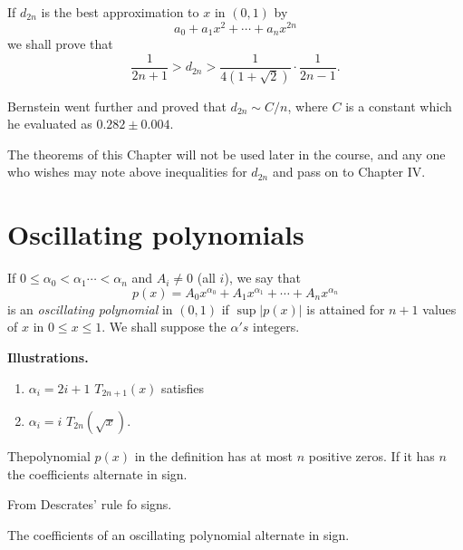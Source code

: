 If $d_{2n}$ is the best approximation to $x$ in $(0,1)$ by 
$$
a_ 0 +a_1 x^2+ \cdots + a_n x^{2n}
$$
we shall prove that
$$
\frac{1}{2n+1} > d_{2n}> \frac{1}{4(1+ \sqrt{2})}\cdot \frac{1}{2n-1}.
$$

Bernstein went further and proved that $d_{2n} \sim C/n$, where $C$ is
a constant which he evaluated as $0.282 \pm 0.004$. 

The theorems of this Chapter will not be used later in the course, and
any one who wishes may note above inequalities for $d_{2n}$ and pass
on to Chapter IV. 

\section{Oscillating polynomials}\label{chap3:sec8}

\begin{defi*}
  If $0 \leq \alpha_ 0 < \alpha_1 \cdots < \alpha_n$ and $A_i \neq 0$
  (all $i$), we say that 
  $$
  p(x)=A_ 0 x^{\alpha _0}+A_1 x^{\alpha_ 1}+ \cdots + A_n x^{\alpha _ n}
  $$
  is an \textit{oscillating polynomial} in $(0,1)$ if $\sup |p(x)|$ is
  attained for $n+1$ values of $x$ in $0 \leq x \leq 1$. We shall
  suppose the $\alpha's$ integers. 

\noindent\textbf{Illustrations.} 

  \begin{enumerate}[\quad \rm (1)]
    \item $\alpha _i =2i+1$  \quad $T_{2n+1}(x)$ \quad satisfies
    \item $\alpha_i = i$  \qquad $T_{2n}(\sqrt{x})$.
  \end{enumerate}
\end{defi*}

\setcounter{lem}{0}
\begin{lem}\label{chap3:sec8:lem1}%
  The\pageoriginale polynomial $p(x)$ in the definition has at most $n$ positive
  zeros. If it has $n$ the coefficients alternate in sign. 
\end{lem}

From Descrates' rule fo signs.
\begin{lem}\label{chap3:sec8:lem2}%
  The coefficients of an oscillating polynomial alternate in sign.
\end{lem}

